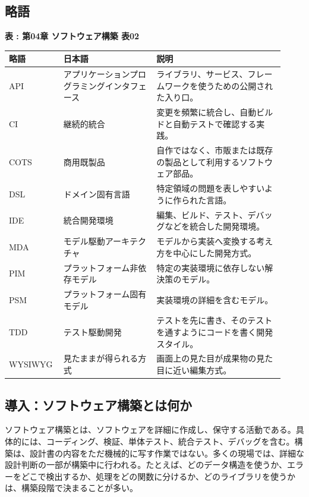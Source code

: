 \subsection*{略語}

\par\smallskip\noindent{}\label{tab:ch04-02}\textbf{表 \thetable: 第04章 ソフトウェア構築 表02}\par\smallskip
\begin{longtable}{L{0.16\linewidth}L{0.32\linewidth}L{0.44\linewidth}}
\toprule
\textbf{略語} & \textbf{日本語} & \textbf{説明} \\
\midrule
API & アプリケーションプログラミングインタフェース & ライブラリ、サービス、フレームワークを使うための公開された入り口。 \\
CI & 継続的統合 & 変更を頻繁に統合し、自動ビルドと自動テストで確認する実践。 \\
COTS & 商用既製品 & 自作ではなく、市販または既存の製品として利用するソフトウェア部品。 \\
DSL & ドメイン固有言語 & 特定領域の問題を表しやすいように作られた言語。 \\
IDE & 統合開発環境 & 編集、ビルド、テスト、デバッグなどを統合した開発環境。 \\
MDA & モデル駆動アーキテクチャ & モデルから実装へ変換する考え方を中心にした開発方式。 \\
PIM & プラットフォーム非依存モデル & 特定の実装環境に依存しない解決策のモデル。 \\
PSM & プラットフォーム固有モデル & 実装環境の詳細を含むモデル。 \\
TDD & テスト駆動開発 & テストを先に書き、そのテストを通すようにコードを書く開発スタイル。 \\
WYSIWYG & 見たままが得られる方式 & 画面上の見た目が成果物の見た目に近い編集方式。 \\
\bottomrule
\end{longtable}

\subsection*{導入：ソフトウェア構築とは何か}

ソフトウェア構築とは、ソフトウェアを詳細に作成し、保守する活動である。具体的には、コーディング、検証、単体テスト、統合テスト、デバッグを含む。構築は、設計書の内容をただ機械的に写す作業ではない。多くの現場では、詳細な設計判断の一部が構築中に行われる。たとえば、どのデータ構造を使うか、エラーをどこで検出するか、処理をどの関数に分けるか、どのライブラリを使うかは、構築段階で決まることが多い。


